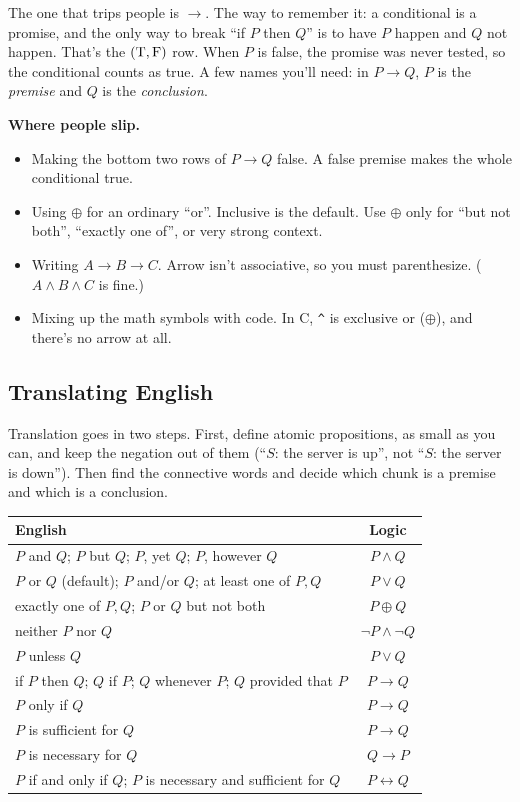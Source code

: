 The one that trips people is $\to$. The way to remember it: a conditional is a promise, and the only way to break ``if $P$ then $Q$'' is to have $P$ happen and $Q$ not happen. That's the $(\mathrm{T},\mathrm{F})$ row. When $P$ is false, the promise was never tested, so the conditional counts as true. A few names you'll need: in $P\to Q$, $P$ is the \emph{premise} and $Q$ is the \emph{conclusion}.

\textbf{Where people slip.}
\begin{itemize}
  \item Making the bottom two rows of $P\to Q$ false. A false premise makes the whole conditional true.
  \item Using $\oplus$ for an ordinary ``or''. Inclusive is the default. Use $\oplus$ only for ``but not both'', ``exactly one of'', or very strong context.
  \item Writing $A\to B\to C$. Arrow isn't associative, so you must parenthesize. ($A\land B\land C$ is fine.)
  \item Mixing up the math symbols with code. In C, \texttt{\^{}} is exclusive or ($\oplus$), and there's no arrow at all.
\end{itemize}

\subsection{Translating English}

Translation goes in two steps. First, define atomic propositions, as small as you can, and keep the negation out of them (``$S$: the server is up'', not ``$S$: the server is down''). Then find the connective words and decide which chunk is a premise and which is a conclusion.

\begin{center}
\begin{tabularx}{\linewidth}{@{}Lc@{}}
\toprule
\textbf{English} & \textbf{Logic}\\
\midrule
$P$ and $Q$; $P$ but $Q$; $P$, yet $Q$; $P$, however $Q$ & $P\land Q$\\
$P$ or $Q$ (default); $P$ and/or $Q$; at least one of $P,Q$ & $P\lor Q$\\
exactly one of $P,Q$; $P$ or $Q$ but not both & $P\oplus Q$\\
neither $P$ nor $Q$ & $\lnot P\land\lnot Q$\\
$P$ unless $Q$ & $P\lor Q$\\
if $P$ then $Q$; $Q$ if $P$; $Q$ whenever $P$; $Q$ provided that $P$ & $P\to Q$\\
$P$ only if $Q$ & $P\to Q$\\
$P$ is sufficient for $Q$ & $P\to Q$\\
$P$ is necessary for $Q$ & $Q\to P$\\
$P$ if and only if $Q$; $P$ is necessary and sufficient for $Q$ & $P\leftrightarrow Q$\\
\bottomrule
\end{tabularx}
\end{center}

